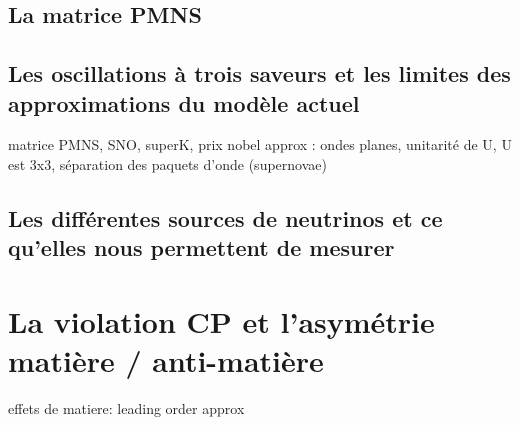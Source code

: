         \subsection{La matrice PMNS}
            
        
        \subsection{Les oscillations à trois saveurs et les limites des approximations du modèle actuel}\label{sec::oscillations}
            \cite{Nunokawa2007}
            matrice PMNS, SNO, superK, prix nobel
            approx : ondes planes, unitarité de U, U est 3x3, séparation des paquets d'onde (supernovae)
        
        \subsection{Les différentes sources de neutrinos et ce qu'elles nous permettent de mesurer}
    
    \section{La violation CP et l'asymétrie matière / anti-matière}\label{sec::CP_violation}
        effets de matiere: \cite{Wolfenstein1978,Mikheyev1986}
        leading order approx \cite{Marciano2006}